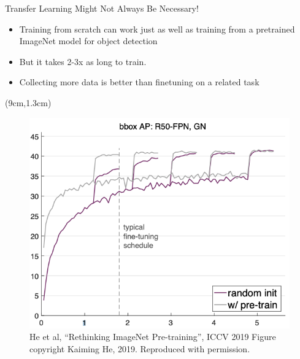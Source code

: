 \documentclass[serif, aspectratio=169]{beamer}
\begin{document}
\begin{frame}{Transfer Learning Might Not Always Be Necessary!}
	\begin{itemize}
		\item Training from scratch can work just \newline as well as training from a pretrained
		\newline ImageNet model for object detection
		\item But it takes 2-3x as long to train.
		\item Collecting more data is better than \newline finetuning on a related task
	\end{itemize}
	\begin{textblock*}{5cm}(9cm,1.3cm) %
		\begin{figure}
			\includegraphics[keepaspectratio, scale=0.28]{pic/rethinking_imagenet}
			\caption*{\scriptsize He et al, “Rethinking ImageNet Pre-training”, ICCV 2019 Figure copyright Kaiming He, 2019. Reproduced with permission.}
		\end{figure}
	\end{textblock*}
\end{frame}
\end{document}
